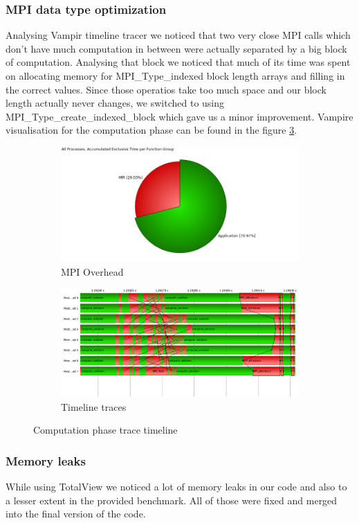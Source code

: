 \documentclass{article}
\begin{document}
\subsubsection{MPI data type optimization}
Analysing Vampir timeline tracer we noticed that two very close MPI calls which don't have much computation in between were actually separated by a big block of computation. Analysing that block we noticed that much of its time was spent on allocating memory for MPI\_Type\_indexed block length arrays and filling in the correct values. Since those operatios take too much space and our block length actually never changes, we switched to using MPI\_Type\_create\_indexed\_block which gave us a minor improvement. Vampire visualisation for the computation phase can be found in the figure \ref{fig:8}.
\begin{figure}
	\centering
	\begin{subfigure}[h]{\textwidth}
		\includegraphics[width=\textwidth]{iter-pent-dual-allread-8-Function_Summary_traces.png}
		\caption{MPI Overhead}
		\label{fig:overhead}
	\end{subfigure}
	\begin{subfigure}[h]{\textwidth}
		\includegraphics[width=\textwidth]{iter-pent-dual-allread-8-Master_Timeline_traces.png}
		\caption{Timeline traces}
		\label{fig:traces}
	\end{subfigure}
	\caption{Computation phase trace timeline}\label{fig:8}
\end{figure}

\subsubsection{Memory leaks}
While using TotalView we noticed a lot of memory leaks in our code and also to a lesser extent in the provided benchmark. All of those were fixed and merged into the final version of the code.


\end{document}
